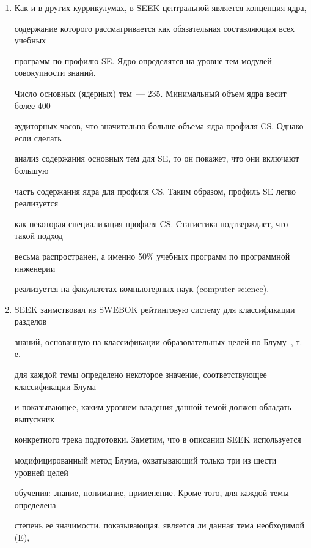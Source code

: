 \begin{enumerate}[1.]
программного обеспечения>> (VAV), <<Эволюция программного обеспечения>> (EVL), 

<<Процессы разработки программного обеспечения>> (PRO), <<Качество программного 

обеспечения>> (QUA), <<Управление программными проектами>> (MGT). 

\item Как и в других куррикулумах, в SEEK центральной является концепция ядра, 

содержание которого рассматривается как обязательная составляющая всех учебных 

программ по профилю SE. Ядро определятся на уровне тем модулей совокупности знаний. 

Число основных (ядерных) тем~--- 235. Минимальный объем ядра весит более 400 

аудиторных часов, что значительно больше объема ядра профиля CS. Однако если сделать 

анализ содержания основных тем для SE, то он покажет, что они включают большую 

часть содержания ядра для профиля CS. Таким образом, профиль SE легко реализуется 

как некоторая специализация профиля CS. Статистика подтверждает, что такой подход 

весьма распространен, а именно 50\% учебных программ по программной инженерии 

реализуется на факультетах компьютерных наук (computer science). 

\item SEEK заимствовал из SWEBOK рейтинговую систему для классификации разделов 

знаний, основанную на классификации образовательных целей по Блуму~\cite{19-s}, т.\,е.\ 

для каждой темы определено некоторое значение, соответствующее классификации Блума 

и показывающее, каким уровнем владения данной темой должен обладать выпускник 

конкретного трека подготовки. Заметим, что в описании SEEK используется 

модифицированный метод Блума, охватывающий только три из шести уровней целей 

обучения: знание, понимание, применение. Кроме того, для каждой темы определена 

степень ее значимости, показывающая, является ли данная тема необходимой (E), 


\end{enumerate}
